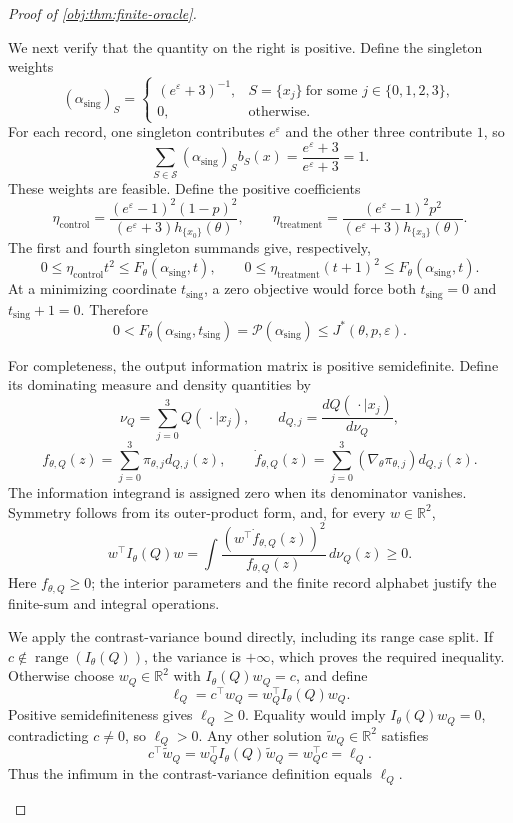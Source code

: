 \begin{proof}[Proof of \cref{obj:thm:finite-oracle}]
\begin{enumerate}
We next verify that the quantity on the right is positive. Define
the singleton weights
\[
(\alpha_{\mathrm{sing}})_S=
\begin{cases}
(e^\varepsilon+3)^{-1},&S=\{x_j\}\ \text{for some }j\in\{0,1,2,3\},\\
0,&\text{otherwise}.
\end{cases}
\]
For each record, one singleton contributes \(e^\varepsilon\)
and the other three contribute \(1\), so
\[
\sum_{S\in\mathcal S}
(\alpha_{\mathrm{sing}})_S b_S(x)
=\frac{e^\varepsilon+3}{e^\varepsilon+3}=1.
\]
These weights are feasible. Define the positive coefficients
\[
\eta_{\mathrm{control}}
=
\frac{(e^\varepsilon-1)^2(1-p)^2}
{(e^\varepsilon+3)h_{\{x_0\}}(\theta)},
\qquad
\eta_{\mathrm{treatment}}
=
\frac{(e^\varepsilon-1)^2p^2}
{(e^\varepsilon+3)h_{\{x_3\}}(\theta)}.
\]
The first and fourth singleton summands give, respectively,
\[
0\le\eta_{\mathrm{control}}t^2
\le F_\theta(\alpha_{\mathrm{sing}},t),
\qquad
0\le\eta_{\mathrm{treatment}}(t+1)^2
\le F_\theta(\alpha_{\mathrm{sing}},t).
\]
At a minimizing coordinate \(t_{\mathrm{sing}}\), a zero objective
would force both \(t_{\mathrm{sing}}=0\) and
\(t_{\mathrm{sing}}+1=0\). Therefore
\[
0<
F_\theta(\alpha_{\mathrm{sing}},t_{\mathrm{sing}})
=
\mathscr P(\alpha_{\mathrm{sing}})
\le J^*(\theta,p,\varepsilon).
\]

For completeness, the output information matrix is positive
semidefinite. Define its dominating measure and density quantities
by
\[
\nu_Q=\sum_{j=0}^3Q(\,\cdot\mid x_j),
\qquad
d_{Q,j}=\frac{dQ(\,\cdot\mid x_j)}{d\nu_Q},
\]
\[
f_{\theta,Q}(z)=\sum_{j=0}^3\pi_{\theta,j}d_{Q,j}(z),
\qquad
\dot f_{\theta,Q}(z)=
\sum_{j=0}^3(\nabla_\theta\pi_{\theta,j})d_{Q,j}(z).
\]
The information integrand is assigned zero when its denominator
vanishes. Symmetry follows from its outer-product form, and, for
every \(w\in\mathbb R^2\),
\[
w^\top I_\theta(Q)w
=
\int
\frac{(w^\top\dot f_{\theta,Q}(z))^2}
{f_{\theta,Q}(z)}\,d\nu_Q(z)\ge0.
\]
Here \(f_{\theta,Q}\ge0\); the interior parameters and the finite
record alphabet justify the finite-sum and integral operations.

We apply the contrast-variance bound directly, including its range
case split. If \(c\notin\operatorname{range}(I_\theta(Q))\), the
variance is \(+\infty\), which proves the required inequality.
Otherwise choose \(w_Q\in\mathbb R^2\) with
\(I_\theta(Q)w_Q=c\), and define
\[
\ell_Q=c^\top w_Q=w_Q^\top I_\theta(Q)w_Q.
\]
Positive semidefiniteness gives \(\ell_Q\ge0\). Equality would imply
\(I_\theta(Q)w_Q=0\), contradicting \(c\ne0\), so \(\ell_Q>0\).
Any other solution \(\widetilde w_Q\in\mathbb R^2\) satisfies
\[
c^\top\widetilde w_Q
=
w_Q^\top I_\theta(Q)\widetilde w_Q
=
w_Q^\top c
=\ell_Q.
\]
Thus the infimum in the contrast-variance definition equals
\(\ell_Q\).


\end{enumerate}
\end{proof}
